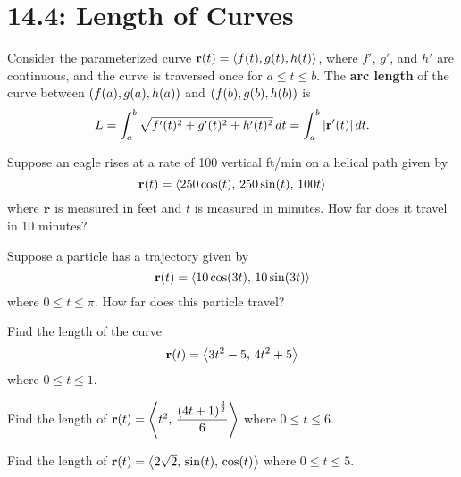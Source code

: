 \documentclass[mathNotesPreamble]{subfiles}
\begin{document}
\section{14.4: Length of Curves}
  \begin{defn*}
    Consider the parameterized curve ${\mathbf{r}}(t)={\left\langle f(t),g(t),h(t) \right\rangle}$, where $f'$, $g'$, and $h'$ are continuous, and the curve is traversed once for $a\leq t\leq b$. The \textbf{arc length} of the curve between ${\left(f(a), g(a), h(a)\right)}$ and ${\left(f(b), g(b), h(b)\right)}$ is
    \[L=\int_a^b \sqrt{f'(t)^2+g'(t)^2+h'(t)^2}\,dt=\int_a^b{\left\vert{\mathbf{r}}'(t)\right\vert}\,dt.\]
  \end{defn*}
  \begin{ex*}
    Suppose an eagle rises at a rate of 100 vertical ft/min on a helical path given by
      \[{\mathbf{r}}(t)={\left\langle 250\cos(t),\,250\sin(t),\,100t \right\rangle}\] 
    where ${\mathbf{r}}$ is measured in feet and $t$ is measured in minutes. How far does it travel in 10 minutes?
  \end{ex*}
  \pagebreak

  \begin{ex*}
    Suppose a particle has a trajectory given by 
      \[{\mathbf{r}}(t)={\left\langle 10\cos(3t),\,10\sin(3t) \right\rangle}\]
    where $0\leq t\leq \pi$. How far does this particle travel?
  \end{ex*}

  \begin{ex*}
    Find the length of the curve
      \[{\mathbf{r}}(t)={\left\langle 3t^2-5,\,4t^2+5 \right\rangle}\]
    where $0\leq t\leq 1$.
  \end{ex*}
  \pagebreak

  \begin{ex*}
    Find the length of ${\mathbf{r}}(t)={\left\langle t^2,\,\dfrac{{\left(4t+1\right)}^{\frac{3}{2}}}{6} \right\rangle}$ where $0\leq t\leq 6$.
  \end{ex*}

  \begin{ex*}
    Find the length of ${\mathbf{r}}(t)={\left\langle 2\sqrt{2},\,\sin(t),\,\cos(t) \right\rangle}$ where $0\leq t\leq 5$.
  \end{ex*}
  \pagebreak
\end{document}
